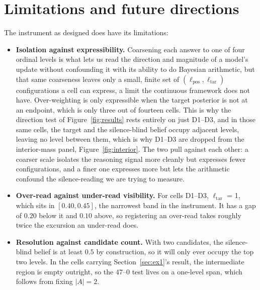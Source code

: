 \documentclass{article}
\theoremstyle{plain}
\theoremstyle{definition}
\theoremstyle{remark}
\newcommand{\ltar}{\ell_{\mathrm{tar}}}        %
\newcommand{\lcor}{\ltar}                       %
\newcommand{\lpos}{\ell_{\mathrm{pos}}}
\begin{document}
\section{Limitations and future directions}\label{sec:blind}

The instrument as designed does have its limitations:
\begin{itemize}
\itemsep0em
  \item \textbf{Isolation against expressibility.} Coarsening each answer to one
    of four ordinal levels is what lets us read the direction and magnitude of a
    model's update without confounding it with its ability to do Bayesian arithmetic,
    but that same coarseness leaves only a small, finite set of
    $(\lpos, \lcor)$ configurations a cell can express, a limit the continuous
    framework does not have. Over-weighting is only expressible when the target
    posterior is not at an endpoint, which is only three out of fourteen cells. 
    This is why the direction test of Figure~\ref{fig:results} rests entirely on 
    just D1--D3, and
    in those same cells, the target and the silence-blind belief occupy adjacent
    levels, leaving no level between them, which is why D1--D3 are dropped from the
    interior-mass panel, Figure~\ref{fig:interior}. The two pull against each
    other: a coarser scale isolates the reasoning signal more cleanly but
    expresses fewer configurations, and a finer one expresses more but lets the
    arithmetic confound the silence-reading we are trying to measure.
  \item \textbf{Over-read against under-read visibility.} 
    For cells D1--D3, $\lcor$ = 1, which sits in $[0.40,0.45]$, the narrowest 
    band in the instrument. It has a gap of $0.20$ below it and $0.10$ above, so
    registering an over-read takes roughly twice the excursion an under-read does.
  \item \textbf{Resolution against candidate count.} With two candidates, the
    silence-blind belief is at least $0.5$ by construction, so it will only ever
    occupy the top two levels. In the cells carrying Section~\ref{sec:ex1}'s
    result, the intermediate region is empty outright, so the $47$--$0$ test lives
    on a one-level span, which follows from fixing $|A| = 2$.
\end{itemize}
\end{document}
